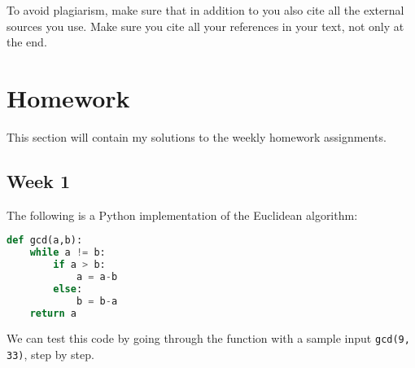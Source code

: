 \documentclass{article}
\theoremstyle{theorem}
\theoremstyle{definition}
\theoremstyle{remark}
\begin{document}
To avoid plagiarism, make sure that in addition to \cite{PL} you also cite all the external sources you use. Make sure you cite all your references in your text, not only at the end.


\section{Homework}\label{homework}

This section will contain my solutions to the weekly homework assignments. 

\subsection{Week 1}

The following is a Python implementation of the Euclidean algorithm:

\begin{lstlisting}[language=Python]
def gcd(a,b):
    while a != b:
        if a > b:
            a = a-b
        else:
            b = b-a
    return a
\end{lstlisting}

\newpage %

\noindent We can test this code by going through the function with a sample input \texttt{gcd(9, 33)}, step by step.
\end{document}
